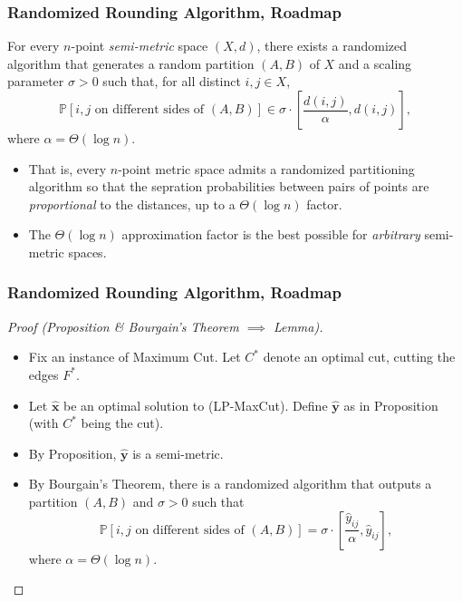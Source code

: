 \documentclass{beamer}
\newcommand{\PP}{\mathbb{P}}
\begin{document}
    \begin{frame}
        \frametitle{Randomized Rounding Algorithm, Roadmap}
    
        \begin{theorem}
            For every $n$-point \emph{semi-metric} space $(X, d)$, there exists a randomized algorithm that generates a random partition $(A, B)$ of $X$ and a scaling parameter $\sigma > 0$ such that, for all distinct $i, j \in X$,
            $$ \PP[\text{$i, j$ on different sides of $(A, B)$}] \in \sigma \cdot \left[\frac{d(i, j)}{\alpha}, d(i, j)\right], $$
            where $\alpha = \Theta(\log n)$.
        \end{theorem}

        \pause

        \begin{itemize}
            \item That is, every $n$-point metric space admits a randomized partitioning algorithm so that the sepration probabilities between pairs of points are \emph{proportional} to the distances, up to a $\Theta(\log n)$ factor. \pause
            \item The $\Theta(\log n)$ approximation factor is the best possible for \emph{arbitrary} semi-metric spaces.
        \end{itemize}
    \end{frame}

    \begin{frame}
        \frametitle{Randomized Rounding Algorithm, Roadmap}
    
        \begin{proof}[Proof (Proposition \& Bourgain's Theorem $\implies$ Lemma)]
            \renewcommand{\qedsymbol}{}
            \begin{itemize}
                \item Fix an instance of {\sc Maximum Cut}. Let $C^*$ denote an optimal cut, cutting the edges $F^*$. \pause
                \item Let $\mathbf{\hat x}$ be an optimal solution to {\sc (LP-MaxCut)}. Define $\mathbf{\hat y}$ as in Proposition (with $C^*$ being the cut). \pause
                \item By Proposition, $\mathbf{\hat y}$ is a semi-metric. \pause
                \item By Bourgain's Theorem, there is a randomized algorithm that outputs a partition $(A, B)$ and $\sigma > 0$ such that
                $$ \PP[\text{$i, j$ on different sides of $(A, B)$}] = \sigma \cdot \left[\frac{\hat y_{ij}}{\alpha}, \hat y_{ij}\right], $$
                where $\alpha = \Theta(\log n)$.
            \end{itemize}
        \end{proof}
    \end{frame}
\end{document}
